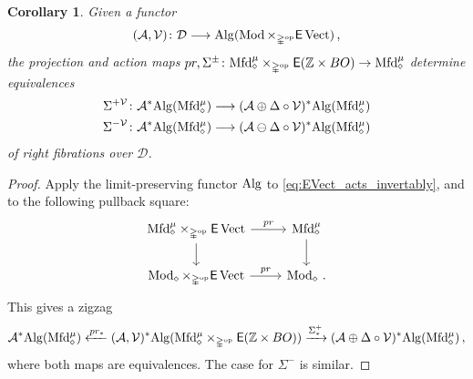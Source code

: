 \documentclass[10pt]{amsart}
\numberwithin{equation}{section}
\newtheorem{cor}[prop]{Corollary}
\theoremstyle{definition}
\DeclareMathOperator{\Mod}{Mod}
\DeclareMathOperator{\op}{op}
\DeclareMathOperator{\Vect}{Vect}
\newcommand{\Mfd}{\mathrm{Mfd}\vphantom{d}}
\newcommand{\Alg}{\mathrm{Alg}\vphantom{z}}
\newcommand{\bZ}{\mathbb{Z}}
\newcommand{\Simp}{\mathbb{\Delta}}
\newcommand{\cA}{\mathcal{A}}
\newcommand{\calD}{\mathcal{D}}
\newcommand{\cV}{\mathcal{V}}
\newcommand{\sfE}{\mathsf{E}}
\renewcommand{\to}{\mathchoice{\longrightarrow}{\rightarrow}{}{}}
\begin{document}
\begin{cor}\label{cor:U_compensation}
	Given a functor
	\begin{align*}
		(\cA, \cV) \colon \calD \to \Alg(\Mod \times_{\Simp^{\op}} \sfE \Vect) \,,
	\end{align*}
	the projection and action maps $pr, \Sigma^{\pm} \colon \Mfd_{\diamond}^{\mu} \times_{\Simp^{\op}} \sfE(\bZ\times BO) \to \Mfd_{\diamond}^{\mu}$ determine equivalences
	\begin{align*}
		\Sigma^{+\cV} \colon \cA^{*}\Alg(\Mfd_{\diamond}^{\mu}) &\to  (\cA\oplus \Delta\circ \cV)^{*}\Alg(\Mfd_{\diamond}^{\mu}) \\
		\Sigma^{-\cV} \colon \cA^{*}\Alg(\Mfd_{\diamond}^{\mu}) & \to  (\cA\ominus \Delta\circ \cV)^{*}\Alg(\Mfd_{\diamond}^{\mu})
	\end{align*}
	of right fibrations over $\calD$.
\end{cor}
\begin{proof}
	Apply the limit-preserving functor $\Alg$ to \eqref{eq:EVect_acts_invertably}, and to the following pullback square:
	\begin{equation*}
		\begin{tikzcd}
			\Mfd^{\mu}_{\diamond} \times_{\Simp^{\op}} \sfE\Vect \arrow[r, "pr"] \arrow[d]      &   \Mfd_{\diamond}^{\mu}  \arrow[d] \\
			\Mod_{\diamond} \times_{\Simp^{\op}} \sfE \Vect \arrow[r, "pr"]               & \Mod_{\diamond}   \,.
		\end{tikzcd}
	\end{equation*}
	This gives a zigzag
	\begin{align*}
		\cA^{*}\Alg(\Mfd_{\diamond}^{\mu}) \xleftarrow{pr_{*}} (\cA, \cV)^{*} \Alg(\Mfd^{\mu}_{\diamond} \times_{\Simp^{\op}} \sfE(\bZ\times BO)) \xrightarrow{\Sigma_{*}^{+}} (\cA \oplus \Delta\circ \cV)^{*}\Alg(\Mfd^{\mu}_{\diamond}) \,,
	\end{align*}
	where both maps are equivalences.
  The case for $\Sigma^{-}$ is similar.
\end{proof}
\end{document}
